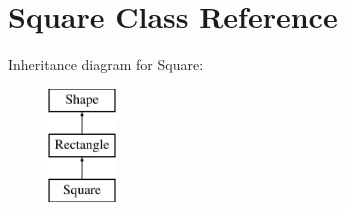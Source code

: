 \hypertarget{class_square}{}\section{Square Class Reference}
\label{class_square}
Inheritance diagram for Square\+:\begin{figure}[H]
\begin{center}
\leavevmode
\includegraphics[height=3.000000cm]{class_square}
\end{center}
\end{figure}
